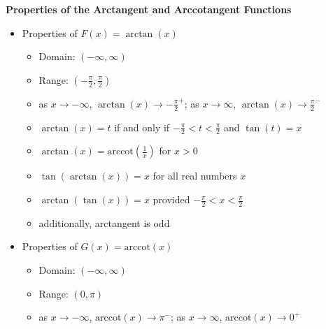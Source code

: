 \colorbox{ResultColor}{\bbm

\begin{thm} \label{arctangentcotangentfunctionprops}  \textbf{Properties of the Arctangent and Arccotangent Functions}     

\begin{itemize}

\item Properties of $F(x)= \arctan(x)$

\begin{itemize}

\item Domain: $(-\infty, \infty)$

\item Range: $\left(-\frac{\pi}{2}, \frac{\pi}{2}\right)$

\item  as $x \rightarrow -\infty$, $\arctan(x) \rightarrow -\frac{\pi}{2}^{+}$;  as $x \rightarrow \infty$, $\arctan(x) \rightarrow \frac{\pi}{2}^{-}$

\item  $\arctan(x) = t$ if and only if $-\frac{\pi}{2} < t < \frac{\pi}{2}$ and $\tan(t) = x$

\item  $\arctan(x) = \mbox{arccot}\left(\frac{1}{x}\right)$ for $x > 0$

\item  $\tan\left(\arctan(x)\right) = x$ for all real numbers $x$

\item  $\arctan(\tan(x)) = x$ provided $-\frac{\pi}{2} < x < \frac{\pi}{2}$

\item additionally, arctangent is odd

\end{itemize}

\item Properties of $G(x) = \mbox{arccot}(x)$

\begin{itemize}

\item Domain: $(-\infty, \infty)$

\item Range: $(0, \pi)$

\item  as $x \rightarrow -\infty$, $\mbox{arccot}(x) \rightarrow \pi^{-}$; as $x \rightarrow \infty$, $\mbox{arccot}(x) \rightarrow 0^{+}$


\end{itemize}
\end{itemize}
\end{thm}}
